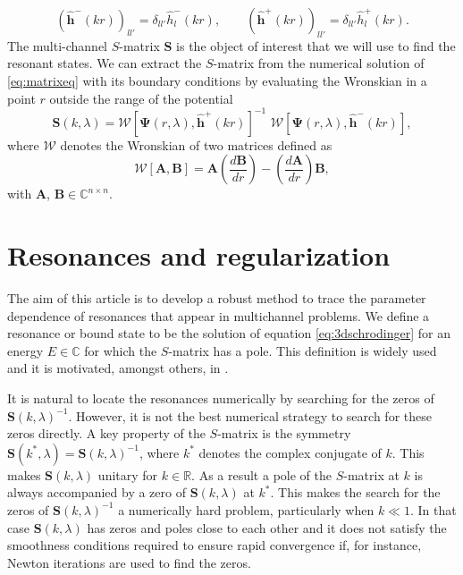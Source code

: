 \documentclass[mathpazo]{cicp}
\begin{document}
\begin{equation}
	\left(\hat{\mathbold{h}}^{-}(kr)\right)_{ll'} =  \delta_{ll'} \hat{h}_{l}^{-}(kr), \qquad \left(\hat{\mathbold{h}}^{+}(kr)\right)_{ll'} = \delta_{ll'} \hat{h}_{l}^{+}(kr).
\end{equation}
The multi-channel $S$-matrix $\mathbold{S}$ is the object of interest that we will use to find the resonant states. We can extract the $S$-matrix from the numerical solution of \eqref{eq:matrixeq} with its boundary conditions by evaluating the Wronskian in a point $r$ outside the range of the potential 
\begin{equation}
	\label{eq:Smatrix_and_wronskian}
 	\mathbold{S}(k,\lambda) = \mathcal{W}\left[\mathbold{\Psi}(r,\lambda),\hat{\mathbold{h}}^{+}(kr)\right]^{-1}\,\, \mathcal{W}\left[\mathbold{\Psi}(r,\lambda),\hat{\mathbold{h}}^{-}(kr)\right], 
\end{equation}
where $\mathcal{W}$ denotes the Wronskian of two matrices defined as
\begin{equation}
	\label{eq:Wronskian}
	\mathcal{W}[\mathbold{A},\mathbold{B}] = \mathbold{A} \left(\frac{d \mathbold{B}}{dr} \right)-\left(\frac{d \mathbold{A}}{dr} \right)\mathbold{B},
\end{equation}
with $\mathbold{A}$, $\mathbold{B} \in \mathbb{C}^{n\times n}$.

\section{Resonances and regularization}
\label{sec:Regularization}

The aim of this article is to develop a robust method to trace the parameter dependence of resonances that appear in multichannel problems.  We define a resonance or bound state to be the solution of equation \eqref{eq:3dschrodinger} for an energy $E\in\mathbb{C}$ for which the $S$-matrix has 
a pole. This definition is widely used and it is motivated, amongst others, in \cite{Newton1982,Taylor2006}. 

It is natural to locate the resonances numerically by searching for the zeros of $\mathbold{S}(k,\lambda)^{-1}$. 
However, it is not the best numerical strategy to search for these zeros directly. 
A key property of the $S$-matrix is the symmetry $\mathbold{S}(k^{*},\lambda) = \mathbold{S}(k,\lambda)^{-1}$, where $k^{*}$ denotes 
the complex conjugate of $k$. This makes $\mathbold{S}(k,\lambda)$ unitary for $k\in\mathbb{R}$. 
As a result a pole of the $S$-matrix at $k$ is always accompanied by a zero of $\mathbold{S}(k,\lambda)$ at $k^*$. 
This makes the search for the zeros of $\mathbold{S}(k,\lambda)^{-1}$ a numerically hard problem, particularly when $k \ll 1$. In that 
case $\mathbold{S}(k,\lambda)$ has zeros and poles close to each other and it does not satisfy the smoothness 
conditions required to ensure rapid convergence if, for instance, Newton iterations are used to find the zeros.  
\end{document}
